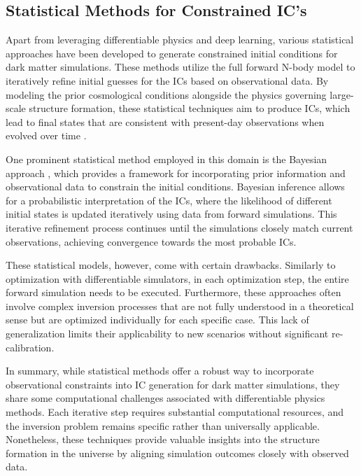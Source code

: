 \documentclass{article}
\begin{document}
\subsection{Statistical Methods for Constrained IC's}

Apart from leveraging differentiable physics and deep learning, various statistical approaches have been developed to generate constrained initial conditions for dark matter simulations. These methods utilize the full forward N-body model to iteratively refine initial guesses for the ICs based on observational data. By modeling the prior cosmological conditions alongside the physics governing large-scale structure formation, these statistical techniques aim to produce ICs, which lead to final states that are consistent with present-day observations when evolved over time \citep{jasche2013bayesian, kitaura2013initial}.

One prominent statistical method employed in this domain is the Bayesian approach \citep{jasche2013bayesian}, which provides a framework for incorporating prior information and observational data to constrain the initial conditions. Bayesian inference allows for a probabilistic interpretation of the ICs, where the likelihood of different initial states is updated iteratively using data from forward simulations. This iterative refinement process continues until the simulations closely match current observations, achieving convergence towards the most probable ICs.

These statistical models, however, come with certain drawbacks. Similarly to optimization with differentiable simulators, in each optimization step, the entire forward simulation needs to be executed. Furthermore, these approaches often involve complex inversion processes that are not fully understood in a theoretical sense but are optimized individually for each specific case. This lack of generalization limits their applicability to new scenarios without significant re-calibration.

In summary, while statistical methods offer a robust way to incorporate observational constraints into IC generation for dark matter simulations, they share some computational challenges associated with differentiable physics methods. Each iterative step requires substantial computational resources, and the inversion problem remains specific rather than universally applicable. Nonetheless, these techniques provide valuable insights into the structure formation in the universe by aligning simulation outcomes closely with observed data.
\end{document}
